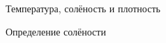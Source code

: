 \begin{chapter}{Температура, солёность и плотность}
\begin{section}{Определение солёности}
\end{section}


\end{chapter}
